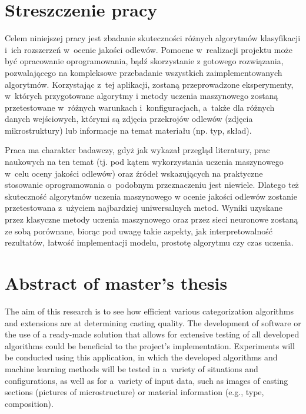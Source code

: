 \section*{Streszczenie pracy}

Celem niniejszej pracy jest zbadanie skuteczności różnych algorytmów klasyfikacji i~ich rozszerzeń w~ocenie jakości odlewów. Pomocne w~realizacji projektu może być opracowanie oprogramowania, bądź skorzystanie z gotowego rozwiązania, pozwalającego na kompleksowe przebadanie wszystkich zaimplementowanych algorytmów. Korzystając z~tej aplikacji, zostaną przeprowadzone eksperymenty, w~których przygotowane algorytmy i metody uczenia maszynowego zostaną przetestowane w~różnych warunkach i~konfiguracjach, a~także dla różnych danych wejściowych, którymi są zdjęcia przekrojów odlewów (zdjęcia mikrostruktury) lub informacje na temat materiału (np. typ, skład). 

Praca ma charakter badawczy, gdyż jak wykazał przegląd literatury, prac naukowych na ten temat (tj. pod kątem wykorzystania uczenia maszynowego w~celu oceny jakości odlewów) oraz źródeł wskazujących na praktyczne stosowanie oprogramowania o~podobnym przeznaczeniu jest niewiele. Dlatego też skuteczność algorytmów uczenia maszynowego w ocenie jakości odlewów zostanie przetestowana z~użyciem najbardziej uniwersalnych metod. Wyniki uzyskane przez klasyczne metody uczenia maszynowego oraz przez sieci neuronowe zostaną ze sobą porównane, biorąc pod uwagę takie aspekty, jak interpretowalność rezultatów, łatwość implementacji modelu, prostotę algorytmu czy czas uczenia.


\section*{Abstract of master's thesis}

The aim of this research is to see how efficient various categorization algorithms and extensions are at determining casting quality. The development of software or the use of a ready-made solution that allows for extensive testing of all developed algorithms could be beneficial to the project's implementation. Experiments will be conducted using this application, in which the developed algorithms and machine learning methods will be tested in a~variety of situations and configurations, as well as for a~variety of input data, such as images of casting sections (pictures of microstructure) or material information (e.g., type, composition).

